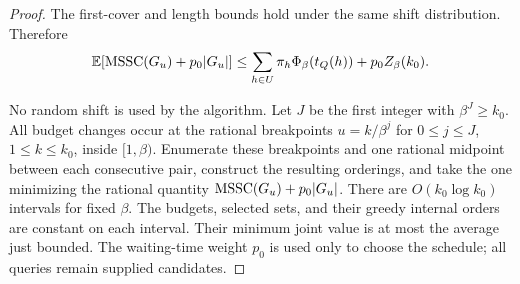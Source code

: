\begin{proof}
The first-cover and length bounds hold under the same shift
distribution. Therefore
\[
 \mathbb E[\operatorname{MSSC}(G_u)+p_0|G_u|]
 \le\sum_{h\in U}\pi_h\Phi_\beta(t_Q(h))
      +p_0Z_\beta(k_0).
\]

No random shift is used by the algorithm. Let $J$ be the first
integer with $\beta^J\ge k_0$. All budget changes occur at the
rational breakpoints $u=k/\beta^j$ for
$0\le j\le J$, $1\le k\le k_0$, inside $[1,\beta)$.
Enumerate these breakpoints and one rational midpoint between
each consecutive pair, construct the resulting orderings, and
take the one minimizing the rational quantity
$\operatorname{MSSC}(G_u)+p_0|G_u|$. There are
$O(k_0\log k_0)$ intervals for fixed $\beta$.
The budgets, selected sets, and their greedy internal orders are
constant on each interval. Their minimum joint value is at most
the average just bounded. The waiting-time weight $p_0$ is used
only to choose the schedule; all queries remain supplied candidates.
\end{proof}


